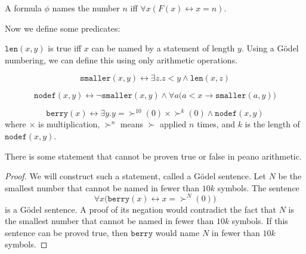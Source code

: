\documentclass{scrbook}
\renewcommand{\implies}{\to}
\renewcommand{\iff}{\leftrightarrow}
\begin{document}
\begin{defn}[names]
  A formula $\phi$ names the number $n$ iff $\forall x (F(x)\iff x=n)$. 
\end{defn}
Now we define some predicates:
\newcommand{\namelen}{\texttt{len}}
\begin{defn}[\namelen]
  $\namelen(x,y)$ is true iff $x$ can be named by a statement of length $y$. Using a Gödel numbering, we can define this using only arithmetic operations. 
\end{defn}
\newcommand{\namesmaller}{\texttt{smaller}}
\begin{defn}[\namesmaller]
  \[
  \namesmaller(x,y)\iff \exists z .z < y \wedge \namelen(x,z)
  \]
\end{defn}
\newcommand{\minnodef}{\texttt{nodef}}
\begin{defn}[\minnodef]
  \[
  \minnodef(x,y)\iff \neg \namesmaller(x,y) \wedge \forall a \bigl(a < x \implies \namesmaller(a,y)\bigr)
  \]
\end{defn}
\newcommand{\berry}{\texttt{berry}}
\begin{defn}[\berry]
  \[
  \berry(x) \iff\exists y. y=\succ^{10}(0)\times \succ^{k}(0)\wedge \minnodef(x,y)
  \]
  where $\times$ is multiplication, $\succ^n$ means $\succ$ applied $n$ times, and $k$ is the length of $\minnodef(x,y)$. 
\end{defn}
\begin{theorem}
  There is some statement that cannot be proven true or false in peano arithmetic.
\end{theorem}
\begin{proof}
  We will construct such a statement, called a Gödel sentence. Let $N$ be the smallest number that cannot be named in fewer than $10k$ symbols. The sentence 
  \begin{equation}
    \label{eq:godel-sentence}
    \forall x \bigl(\berry (x) \iff x= \succ^N(0)\bigr)
  \end{equation}
  is a Gödel sentence. A proof of its negation would contradict the fact that $N$ is the smallest number that cannot be named in fewer than $10k$ symbols. If this sentence can be proved true, then $\berry$ would name $N$ in fewer than $10k$ symbols. 
\end{proof}

\printbibliography
\end{document}
